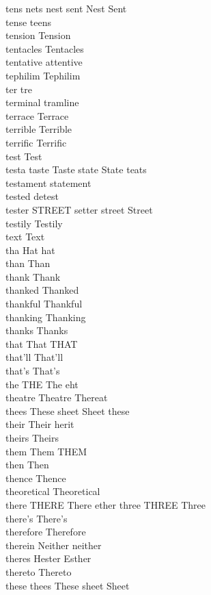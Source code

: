tens nets nest sent Nest Sent\\
tense teens\\
tension Tension\\
tentacles Tentacles\\
tentative attentive\\
tephilim Tephilim\\
ter tre\\
terminal tramline\\
terrace Terrace\\
terrible Terrible\\
terrific Terrific\\
test Test\\
testa taste Taste state State teats\\
testament statement\\
tested detest\\
tester STREET setter street Street\\
testily Testily\\
text Text\\
tha Hat hat\\
than Than\\
thank Thank\\
thanked Thanked\\
thankful Thankful\\
thanking Thanking\\
thanks Thanks\\
that That THAT\\
that'll That'll\\
that's That's\\
the THE The eht\\
theatre Theatre Thereat\\
thees These sheet Sheet these\\
their Their herit\\
theirs Theirs\\
them Them THEM\\
then Then\\
thence Thence\\
theoretical Theoretical\\
there THERE There ether three THREE Three\\
there's There's\\
therefore Therefore\\
therein Neither neither\\
theres Hester Esther\\
thereto Thereto\\
these thees These sheet Sheet\\
